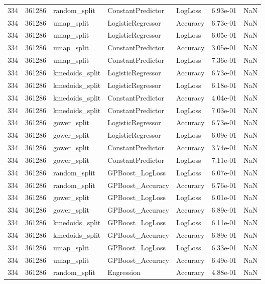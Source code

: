 \begin{tabular}{rrlllrr}
334 & 361286 & random\_split & ConstantPredictor & LogLoss & 6.93e-01 & NaN \\
334 & 361286 & umap\_split & LogisticRegressor & Accuracy & 6.73e-01 & NaN \\
334 & 361286 & umap\_split & LogisticRegressor & LogLoss & 6.05e-01 & NaN \\
334 & 361286 & umap\_split & ConstantPredictor & Accuracy & 3.05e-01 & NaN \\
334 & 361286 & umap\_split & ConstantPredictor & LogLoss & 7.36e-01 & NaN \\
334 & 361286 & kmedoids\_split & LogisticRegressor & Accuracy & 6.73e-01 & NaN \\
334 & 361286 & kmedoids\_split & LogisticRegressor & LogLoss & 6.18e-01 & NaN \\
334 & 361286 & kmedoids\_split & ConstantPredictor & Accuracy & 4.04e-01 & NaN \\
334 & 361286 & kmedoids\_split & ConstantPredictor & LogLoss & 7.03e-01 & NaN \\
334 & 361286 & gower\_split & LogisticRegressor & Accuracy & 6.73e-01 & NaN \\
334 & 361286 & gower\_split & LogisticRegressor & LogLoss & 6.09e-01 & NaN \\
334 & 361286 & gower\_split & ConstantPredictor & Accuracy & 3.74e-01 & NaN \\
334 & 361286 & gower\_split & ConstantPredictor & LogLoss & 7.11e-01 & NaN \\
334 & 361286 & random\_split & GPBoost\_LogLoss & LogLoss & 6.07e-01 & NaN \\
334 & 361286 & random\_split & GPBoost\_Accuracy & Accuracy & 6.76e-01 & NaN \\
334 & 361286 & gower\_split & GPBoost\_LogLoss & LogLoss & 6.01e-01 & NaN \\
334 & 361286 & gower\_split & GPBoost\_Accuracy & Accuracy & 6.89e-01 & NaN \\
334 & 361286 & kmedoids\_split & GPBoost\_LogLoss & LogLoss & 6.11e-01 & NaN \\
334 & 361286 & kmedoids\_split & GPBoost\_Accuracy & Accuracy & 6.89e-01 & NaN \\
334 & 361286 & umap\_split & GPBoost\_LogLoss & LogLoss & 6.33e-01 & NaN \\
334 & 361286 & umap\_split & GPBoost\_Accuracy & Accuracy & 6.49e-01 & NaN \\
334 & 361286 & random\_split & Engression & Accuracy & 4.88e-01 & NaN \\

\end{tabular}
